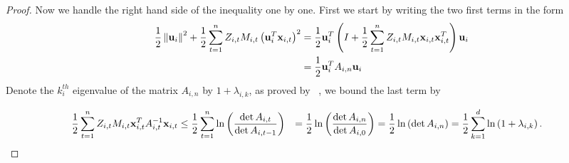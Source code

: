 \begin{proof}
Now we handle the right hand side of the inequality one by one. First we start by writing the two first terms 
in the form 
\begin{equation} \label{eq:so_second_step}
\begin{split}
  \frac{1}{2}\left\Vert {\mathbf{u}_i} \right\Vert^2+\frac{1}{2}\sum_{t=1}^{n}{Z_{i,t}M_{i,t}\left({\mathbf{u}_i^T\mathbf{x}_{i,t}}\right)}^2  
  &= \frac{1}{2}\mathbf{u}_i^T\left({I+\frac{1}{2}\sum_{t=1}^{n}{Z_{i,t}M_{i,t}\mathbf{x}_{i,t}\mathbf{x}_{i,t}^T}}\right)\mathbf{u}_i\\
  &=\frac{1}{2}\mathbf{u}_i^TA_{i,n}\mathbf{u}_i
\end{split}
\end{equation} 
Denote the $k_i^{th}$ eigenvalue of the matrix $A_{i,n}$ by $1+\lambda_{i,k}$, as proved by ~\cite{Forster},
we  bound the last term  by

\begin{equation} \label{eq:so_third_step}
\begin{split}
  \frac{1}{2}\sum_{t=1}^{n}Z_{i,t}M_{i,t}\mathbf{x}_{i,t}^TA_{i,t}^{-1}\mathbf{x}_{i,t} 
  &\le \frac{1}{2}\sum_{t=1}^{n}\ln\left({\frac{\det{A_{i,t}}}{\det{A_{i,t-1}}}}\right) 
  &= \frac{1}{2}\ln\left({\frac{\det{A_{i,n}}}{\det{A_{i,0}}}}\right)
  &=\frac{1}{2}\ln\left({\det{A_{i,n}}}\right) = \frac{1}{2}\sum_{k=1}^{d}\ln\left({1+\lambda_{i,k}}\right).
\end{split}
\end{equation} 


\end{proof}
